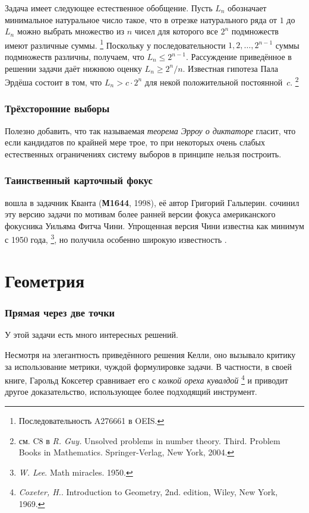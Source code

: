 \documentclass[twoside]{book}
\begin{document}
Задача имеет следующее естественное обобщение.
Пусть $L_n$ обозначает минимальное натуральное число такое,
что в отрезке натурального ряда от $1$ до $L_n$ можно выбрать множество из $n$ чисел для которого все $2^n$ подмножеств имеют различные суммы.%
\footnote{Последовательность A276661 в OEIS.}
Поскольку у последовательности $1,2,\dots, 2^{n-1}$ суммы подмножеств различны, получаем, что $L_n\le 2^{n-1}$.
Рассуждение приведённое в решении задачи даёт нижнюю оценку $L_n\ge 2^n/n$.
Известная гипотеза Пала Эрдёша состоит в том, что $L_n>c\cdot 2^n$ для некой положительной постоянной~$c$.%
\footnote{см. C8 в \emph{R. Guy.} Unsolved problems in number theory. Third. Problem Books in Mathematics.
Springer-Verlag, New York, 2004.}


\subsubsection{Трёхсторонние выборы}
Полезно добавить, что так называемая
\textit{теорема Эрроу о диктаторе} гласит, что если кандидатов по крайней мере трое, то при некоторых очень слабых естественных ограничениях систему выборов в принципе нельзя построить.

\subsubsection{Таинственный карточный фокус}
 вошла в задачник Кванта (\textbf{М1644}, 1998), её автор Григорий Гальперин.  сочинил эту версию задачи по мотивам более ранней версии фокуса американского фокусника Уильяма Фитча Чини.
Упрощенная версия  Чини известна как минимум с 1950 года,
%
\footnote{\emph{W. Lee}. Math miracles. 1950.},
но получила особенно широкую известность  . 

\section{Геометрия}

\subsubsection{Прямая через две точки}
У этой задачи есть много интересных решений.

Несмотря на элегантность приведённого решения Келли, оно вызывало критику за использование метрики, чуждой формулировке задачи.
В частности, в своей книге, Гарольд  Коксетер сравнивает его с \emph{колкой ореха кувалдой}%
\footnote{\emph{Coxeter, H.}. Introduction to Geometry, 2nd. edition, Wiley, New York, 1969.}
и приводит другое доказательство, использующее более подходящий инструмент.
\end{document}
